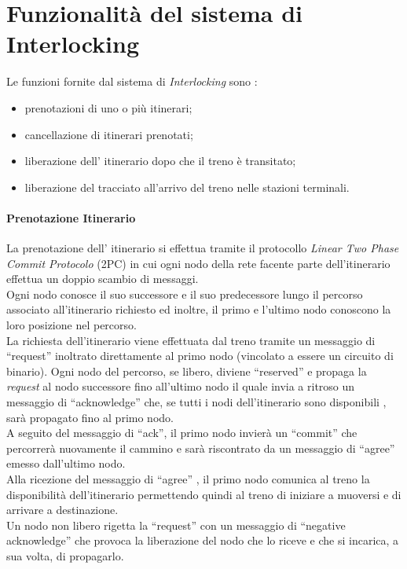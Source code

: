 \documentclass[10pt,a4paper,oneside]{report}
\begin{document}
\section{Funzionalità del sistema di Interlocking}
Le funzioni fornite dal sistema di \emph{Interlocking} sono :
\begin{itemize}
\item prenotazioni di uno o più itinerari;
\item cancellazione di itinerari prenotati;
\item liberazione dell' itinerario dopo che il treno è transitato; 
\item liberazione del tracciato all'arrivo del treno nelle stazioni terminali.
\end{itemize} 
\paragraph*{Prenotazione Itinerario}
La prenotazione dell' itinerario si effettua tramite il protocollo \emph{Linear Two Phase Commit Protocolo } (2PC) in cui ogni nodo della rete facente parte dell'itinerario effettua un doppio scambio di messaggi.\\
Ogni nodo conosce il suo successore e il suo predecessore lungo il percorso associato all'itinerario richiesto ed inoltre, il primo e l'ultimo nodo conoscono la loro posizione nel percorso.\\
La richiesta dell'itinerario viene effettuata dal treno tramite un messaggio di ``request'' inoltrato direttamente al primo nodo (vincolato a essere un circuito di binario). Ogni nodo del percorso, se libero,  diviene ``reserved'' e propaga la \emph{request} al nodo successore fino all'ultimo nodo il quale invia a ritroso un messaggio di ``acknowledge'' che, se tutti i nodi dell'itinerario sono disponibili , sarà propagato fino al primo nodo.\\
A seguito del messaggio di ``ack'', il primo nodo invierà un ``commit'' che percorrerà nuovamente il cammino e sarà riscontrato da un messaggio di ``agree'' emesso dall'ultimo nodo.\\
Alla ricezione del messaggio di ``agree'' , il primo nodo comunica al treno la disponibilità dell'itinerario permettendo quindi al treno di iniziare a muoversi e di arrivare a destinazione.\\

Un nodo non libero rigetta la ``request'' con un messaggio di ``negative acknowledge'' che provoca la liberazione del nodo che lo riceve e che si incarica, a sua volta, di propagarlo.
\end{document}
